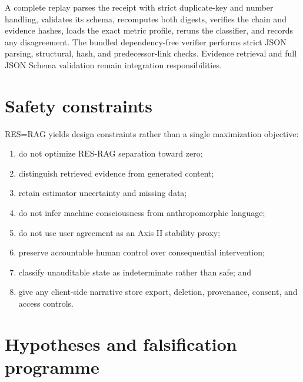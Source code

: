 \documentclass[11pt]{article}
\begin{document}
A complete replay parses the receipt with strict duplicate-key and number
handling, validates its schema, recomputes both digests, verifies the chain and
evidence hashes, loads the exact metric profile, reruns the classifier, and
records any disagreement. The bundled dependency-free verifier performs
strict JSON parsing, structural, hash, and predecessor-link checks. Evidence
retrieval and full JSON Schema validation remain integration responsibilities.

\section{Safety constraints}

RES=RAG yields design constraints rather than a single maximization objective:
\begin{enumerate}
  \item do not optimize RES-RAG separation toward zero;
  \item distinguish retrieved evidence from generated content;
  \item retain estimator uncertainty and missing data;
  \item do not infer machine consciousness from anthropomorphic language;
  \item do not use user agreement as an Axis II stability proxy;
  \item preserve accountable human control over consequential intervention;
  \item classify unauditable state as indeterminate rather than safe; and
  \item give any client-side narrative store export, deletion, provenance,
        consent, and access controls.
\end{enumerate}

\section{Hypotheses and falsification programme}
\end{document}
